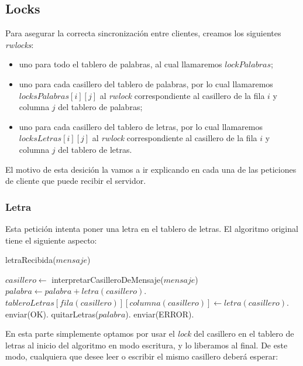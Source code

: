 \subsection{Locks}

Para asegurar la correcta sincronización entre clientes, creamos los siguientes \emph{rwlocks}:

\begin{itemize}

    \item uno para todo el tablero de palabras, al cual llamaremos $lockPalabras$;
    
    \item uno para cada casillero del tablero de palabras, por lo cual llamaremos $locksPalabras[i][j]$ al \emph{rwlock} correspondiente al casillero de la fila $i$ y columna $j$ del tablero de palabras;
    
    \item uno para cada casillero del tablero de letras, por lo cual llamaremos $locksLetras[i][j]$ al \emph{rwlock} correspondiente al casillero de la fila $i$ y columna $j$ del tablero de letras.

\end{itemize}

El motivo de esta desición la vamos a ir explicando en cada una de las peticiones de cliente que puede recibir el servidor.

\subsubsection{Letra}

Esta petición intenta poner una letra en el tablero de letras. El algoritmo original tiene el siguiente aspecto:

\begin{algorithm}[H]
\caption{letraRecibida($mensaje$)}
\begin{algorithmic}[1]
    \STATE $casillero \leftarrow$ interpretarCasilleroDeMensaje($mensaje$)
        \STATE $palabra \leftarrow palabra + letra(casillero)$.
        \STATE $tableroLetras[fila(casillero)][columna(casillero)] \leftarrow letra(casillero)$.
        \STATE enviar(OK).
    \ELSE
        \STATE quitarLetras($palabra$).
        \STATE enviar(ERROR).
    \ENDIF
\end{algorithmic}
\end{algorithm}

\noindent En esta parte simplemente optamos por usar el \emph{lock} del casillero en el tablero de letras al inicio del algoritmo en modo escritura, y lo liberamos al final. De este modo, cualquiera que desee leer o escribir el mismo casillero deberá esperar:

